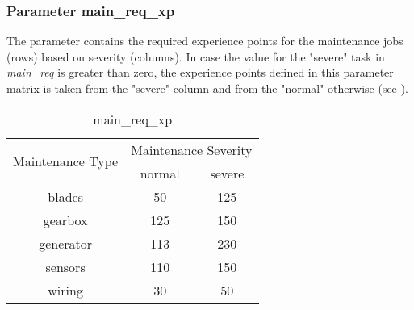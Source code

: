         \subsubsection{Parameter main\_req\_xp}
        The parameter contains the required experience points for the maintenance jobs (rows) 
        based on severity (columns). In case the value for the "severe" task in \textit{main\_req} 
        is greater than zero, the experience points defined in this parameter matrix is taken from
        the "severe" column and from the "normal" otherwise (see ). 
        \begin{table}[H]
            \begin{center}
                \begin{tabular}{ |c|c|c| } 
                \hline
                \multirow{2}{*}{Maintenance Type} &
                \multicolumn{2}{|c|}{Maintenance Severity}\\
                \cline{2-2}\cline{3-3}
                & normal & severe \\ 
                \hline
                blades    & 50  & 125  \\ 
                gearbox   & 125 & 150  \\ 
                generator & 113 & 230 \\ 
                sensors   & 110 & 150  \\ 
                wiring    & 30  & 50  \\ 
                \hline
                \end{tabular}
            \end{center}
        \caption{main\_req\_xp} %
        \label{param_main_req_xp} %
        \end{table}

